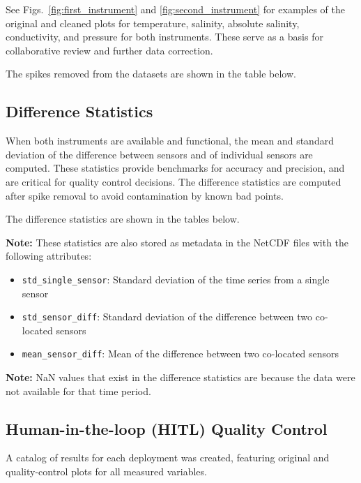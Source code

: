 \documentclass[11pt]{article}
\begin{document}
See Figs.~\ref{fig:first_instrument} and \ref{fig:second_instrument} for examples of the original and cleaned plots for temperature, salinity, absolute salinity, conductivity, and pressure for both instruments.
These serve as a basis for collaborative review and further data correction.

The spikes removed from the datasets are shown in the table below.



\subsection{Difference Statistics}
When both instruments are available and functional, 
the mean and standard deviation of the difference between sensors and of individual sensors are computed. 
These statistics provide benchmarks for accuracy and precision, and are critical for quality control decisions.
The difference statistics are computed after spike removal to avoid contamination by known bad points.

The difference statistics are shown in the tables below.



\textbf{Note:} These statistics are also stored as metadata in the NetCDF files with the following attributes:
\begin{itemize}
\item \texttt{std\_single\_sensor}: Standard deviation of the time series from a single sensor
\item \texttt{std\_sensor\_diff}: Standard deviation of the difference between two co-located sensors
\item \texttt{mean\_sensor\_diff}: Mean of the difference between two co-located sensors
\end{itemize}

\textbf{Note:} NaN values that exist in the difference statistics are because the data were not available for that time period.

\subsection{Human-in-the-loop (HITL) Quality Control}
A catalog of results for each deployment was created, featuring original and quality-control plots for all measured variables. 
\end{document}
